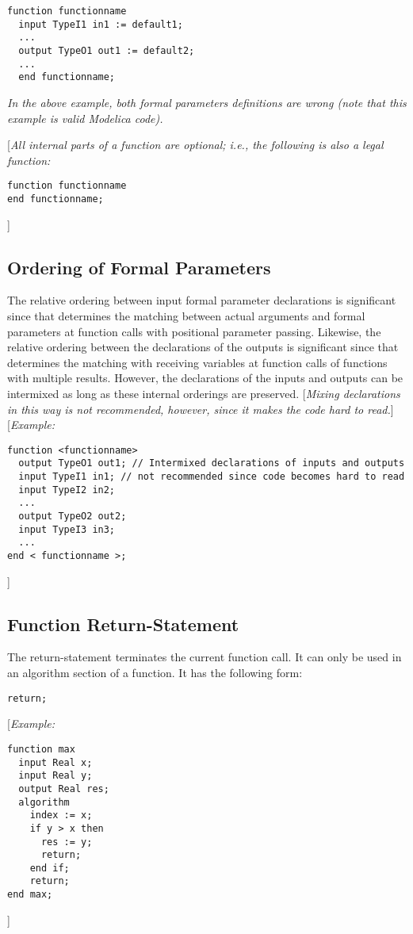 \documentclass[11pt,a4paper,notitlepage]{report}
\begin{document}
\begin{verbatim}
function functionname
  input TypeI1 in1 := default1; 
  ...
  output TypeO1 out1 := default2;
  ...
  end functionname;
\end{verbatim}
\emph{In the above example, both formal parameters definitions are wrong (note that this example is valid Modelica code).}
 
[\emph{All internal parts of a function are optional; i.e., the following is also a legal function:}
\begin{verbatim}
function functionname
end functionname;
\end{verbatim}
]
\subsection{Ordering of Formal Parameters}

The relative ordering between input formal parameter declarations is significant since that determines the matching between actual arguments and formal parameters at function calls with positional parameter passing. Likewise, the relative ordering between the declarations of the outputs is significant since that determines the matching with receiving variables at function calls of functions with multiple results. However, the declarations of the inputs and outputs can be intermixed as long as these internal orderings are preserved. [\emph{Mixing declarations in
this way is not recommended, however, since it makes the code hard to read.}]
[\emph{Example:}
\begin{verbatim}
function <functionname>
  output TypeO1 out1; // Intermixed declarations of inputs and outputs
  input TypeI1 in1; // not recommended since code becomes hard to read
  input TypeI2 in2;
  ...
  output TypeO2 out2;
  input TypeI3 in3;
  ...
end < functionname >;
\end{verbatim}
]

\subsection{Function Return-Statement}\label{functions:return}
The return-statement terminates the current function call. It can only be used in an algorithm section of a function. It has the following form:

\verb"return;"


[\emph{Example:}

\begin{verbatim}
function max
  input Real x;
  input Real y;
  output Real res;
  algorithm
    index := x;
    if y > x then
      res := y;
      return;
    end if;
    return;
end max;
\end{verbatim}
]
\end{document}
